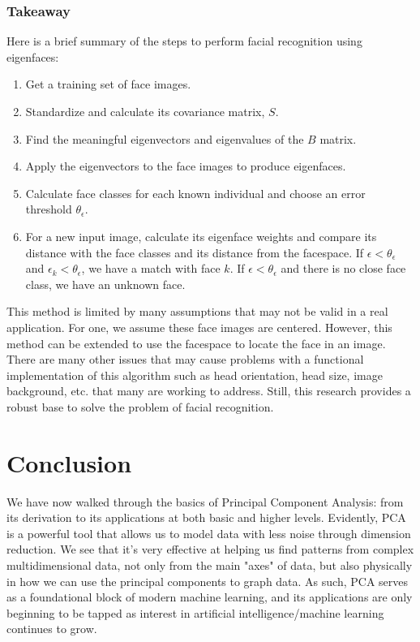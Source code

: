 \documentclass{article}
\begin{document}
\subsubsection{Takeaway}
Here is a brief summary of the steps to perform facial recognition using eigenfaces:
\begin{enumerate}
    \item Get a training set of face images.
    \item Standardize and calculate its covariance matrix, $S$.
    \item Find the meaningful eigenvectors and eigenvalues of the $B$ matrix.
    \item Apply the eigenvectors to the face images to produce eigenfaces.
    \item Calculate face classes for each known individual and choose an error threshold $\theta_\epsilon$.
    \item For a new input image, calculate its eigenface weights and compare its distance with the face classes and its distance from the facespace. If $\epsilon < \theta_\epsilon$ and $\epsilon_k < \theta_\epsilon$, we have a match with face $k$. If $\epsilon < \theta_\epsilon$ and there is no close face class, we have an unknown face. 
\end{enumerate}

This method is limited by many assumptions that may not be valid in a real application. For one, we assume these face images are centered. However, this method can be extended to use the facespace to locate the face in an image. There are many other issues that may cause problems with a functional implementation of this algorithm such as head orientation, head size, image background, etc. that many are working to address. Still, this research provides a robust base to solve the problem of facial recognition. 

\section{Conclusion}
We have now walked through the basics of Principal Component Analysis: from its derivation to its applications at both basic and higher levels. Evidently, PCA is a powerful tool that allows us to model data with less noise through dimension reduction. We see that it's very effective at helping us find patterns from complex multidimensional data, not only from the main "axes" of data, but also physically in how we can use the principal components to graph data. As such, PCA serves as a foundational block of modern machine learning, and its applications are only beginning to be tapped as interest in artificial intelligence/machine learning continues to grow.
\end{document}
